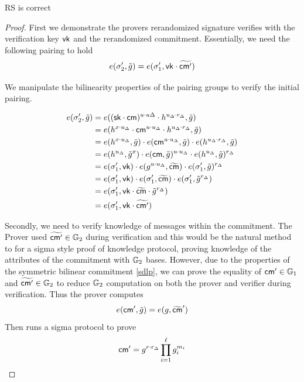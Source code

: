 \begin{theorem}
    RS is correct
\end{theorem}
\begin{proof}
    First we demonstrate the provers rerandomized signature verifies with the verification key $\mathsf{vk}$ and the rerandomized commitment. Essentially, we need the following pairing to hold
    \[
          e(\sigma_2', \tilde{g}) = e(\sigma_1', \mathsf{vk} \cdot \widetilde{\mathsf{cm}'})
    \]

    We manipulate the bilinearity properties of the pairing groups to verify the initial pairing.
    
    \begin{align*}
        e(\sigma_2', \tilde{g}) &= e((\mathsf{sk} \cdot \mathsf{cm})^{u \cdot u\Delta}\cdot h^{u_\Delta \cdot r_\Delta}, \tilde{g}) \\
        &= e(h^{x \cdot u_\Delta}\cdot \mathsf{cm}^{u \cdot u_\Delta} \cdot h^{u_\Delta \cdot r_\Delta}, \tilde{g}) \\
        &= e(h^{x \cdot u_\Delta}, \tilde{g}) \cdot e(\mathsf{cm}^{u \cdot u_\Delta}, \tilde{g}) \cdot e(h^{ u_\Delta \cdot r_\Delta}, \tilde{g}) \\
        &= e(h^{u_\Delta}, \tilde{g}^x) \cdot e(\mathsf{cm}, \tilde{g})^{u \cdot u_\Delta} \cdot e(h^{ u_\Delta}, \tilde{g})^{r_\Delta} \\
        &= e(\sigma_1', \mathsf{vk}) \cdot e(g^{u \cdot u_\Delta}, \widetilde{\mathsf{cm}}) \cdot e(\sigma_1', \tilde{g})^{r_\Delta} \\
        &= e(\sigma_1', \mathsf{vk}) \cdot e(\sigma_1', \widetilde{\mathsf{cm}}) \cdot e(\sigma_1', \tilde{g}^{r_\Delta}) \\
        &= e(\sigma_1', \mathsf{vk} \cdot \widetilde{\mathsf{cm}} \cdot \tilde{g}^{r_\Delta}) \\
        &= e(\sigma_1', \mathsf{vk} \cdot \widetilde{\mathsf{cm}'}) \\
    \end{align*}

    Secondly, we need to verify knowledge of messages within the commitment. The Prover used $\widetilde{\mathsf{cm}'} \in \mathbb{G}_2$ during verification and this would be the natural method to for a sigma style proof of knowledge protocol, proving knowledge of the attributes of the commitment with $\mathbb{G}_2$ bases. However, due to the properties of the symmetric bilinear commitment \ref{sdlp}, we can prove the equality of $\mathsf{cm}' \in \mathbb{G}_1$ and $\widetilde{\mathsf{cm}'} \in \mathbb{G}_2$ to reduce $\mathbb{G}_2$ computation on both the prover and verifier during verification. 
    Thus the prover computes 
    \[
        e(\mathsf{cm}', \tilde{g}) = e(g, \widetilde{\mathsf{cm}}')
    \]
    Then runs a sigma protocol to prove
    \[
    \mathsf{cm}' = g^{r \cdot r_\Delta} \prod_{i=1}^\ell g_i^{m_i}
    \]

\end{proof}




